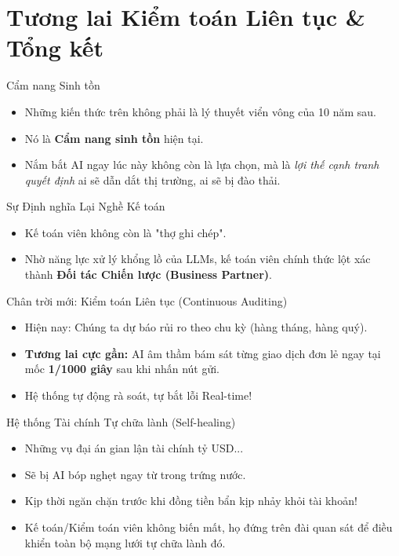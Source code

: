\documentclass[aspectratio=169,12pt]{beamer}
\begin{document}
\section{Tương lai Kiểm toán Liên tục \& Tổng kết}
\begin{frame}
    \tableofcontents[currentsection]
\end{frame}

\begin{frame}{Cẩm nang Sinh tồn}
    \begin{itemize}
        \item Những kiến thức trên không phải là lý thuyết viển vông của 10 năm sau.
        \item Nó là \textbf{Cẩm nang sinh tồn} hiện tại.
        \item Nắm bắt AI ngay lúc này không còn là lựa chọn, mà là \textit{lợi thế cạnh tranh quyết định} ai sẽ dẫn dắt thị trường, ai sẽ bị đào thải.
    \end{itemize}
\end{frame}

\begin{frame}{Sự Định nghĩa Lại Nghề Kế toán}
    \begin{itemize}
        \item Kế toán viên không còn là "thợ ghi chép".
        \item Nhờ năng lực xử lý khổng lồ của LLMs, kế toán viên chính thức lột xác thành \textbf{Đối tác Chiến lược (Business Partner)}.
    \end{itemize}
\end{frame}

\begin{frame}{Chân trời mới: Kiểm toán Liên tục (Continuous Auditing)}
    \begin{itemize}
        \item Hiện nay: Chúng ta dự báo rủi ro theo chu kỳ (hàng tháng, hàng quý).
        \item \textbf{Tương lai cực gần:} AI âm thầm bám sát từng giao dịch đơn lẻ ngay tại mốc \textbf{1/1000 giây} sau khi nhấn nút gửi.
        \item Hệ thống tự động rà soát, tự bắt lỗi Real-time!
    \end{itemize}
\end{frame}

\begin{frame}{Hệ thống Tài chính Tự chữa lành (Self-healing)}
    \begin{itemize}
        \item Những vụ đại án gian lận tài chính tỷ USD...
        \item Sẽ bị AI bóp nghẹt ngay từ trong trứng nước.
        \item Kịp thời ngăn chặn trước khi đồng tiền bẩn kịp nhảy khỏi tài khoản!
        \item Kế toán/Kiểm toán viên không biến mất, họ đứng trên đài quan sát để điều khiển toàn bộ mạng lưới tự chữa lành đó.
    \end{itemize}
\end{frame}
\end{document}
